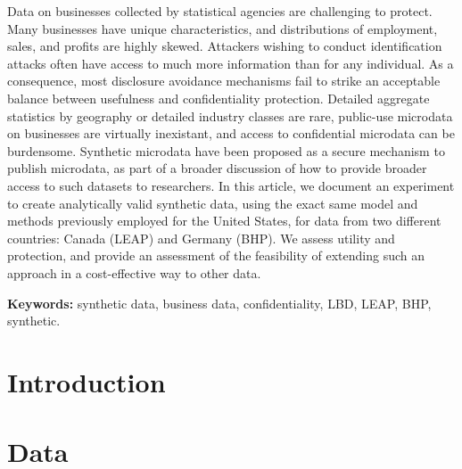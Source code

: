 \documentclass[10pt,twoside]{article}
\begin{document}
\begin{addmargin}[6mm]{6mm}
\begin{small}
\begin{singlespace}

Data on businesses collected by statistical agencies are challenging to protect. Many businesses have unique characteristics, and distributions of employment, sales, and profits are highly skewed. Attackers wishing to conduct identification attacks often have access to much more information than for any individual. As a consequence, most disclosure avoidance mechanisms  fail to strike an acceptable balance between usefulness and confidentiality protection. Detailed aggregate statistics by geography or detailed industry classes  are rare, public-use microdata on businesses are virtually inexistant, and access to confidential microdata can be burdensome. 
Synthetic microdata have been proposed as a secure mechanism to publish microdata, as part of a broader discussion of how  to provide broader access to such datasets to researchers.
In this article, we document an experiment to create analytically valid synthetic data, using the exact same model and methods previously employed for the United States, for data from two different countries: Canada (\ac{LEAP}) and Germany (\ac{BHP}). We assess utility and protection, and provide an assessment of the feasibility of extending such an approach in a cost-effective way to other data.

\smallskip \noindent \textbf{Keywords:} synthetic data, business data, confidentiality, LBD, LEAP, BHP, synthetic.

\end{singlespace}
\end{small}
\end{addmargin}

\smallskip
\acresetall
\section{Introduction}


\section{Data} 
\label{sec:data}


%
\end{document}
